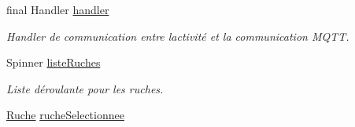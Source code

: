 \begin{DoxyCompactItemize}
\item 
final Handler \hyperlink{classcom_1_1example_1_1bee__honeyt_1_1_i_h_m_mobile_ab04ad38c9ee9a2621cb1b10cc2da1df2}{handler}
\begin{DoxyCompactList}\small\item\em Handler de communication entre l\textquotesingle{}activité et la communication M\+Q\+TT. \end{DoxyCompactList}\item 
Spinner \hyperlink{classcom_1_1example_1_1bee__honeyt_1_1_i_h_m_mobile_a7275bce8e0026b1043371e6878ff65c1}{liste\+Ruches}
\begin{DoxyCompactList}\small\item\em Liste déroulante pour les ruches. \end{DoxyCompactList}\item 
\hyperlink{classcom_1_1example_1_1bee__honeyt_1_1_ruche}{Ruche} \hyperlink{classcom_1_1example_1_1bee__honeyt_1_1_i_h_m_mobile_af59d4b185d3931df2e98568e99673778}{ruche\+Selectionnee}
\end{DoxyCompactItemize}
